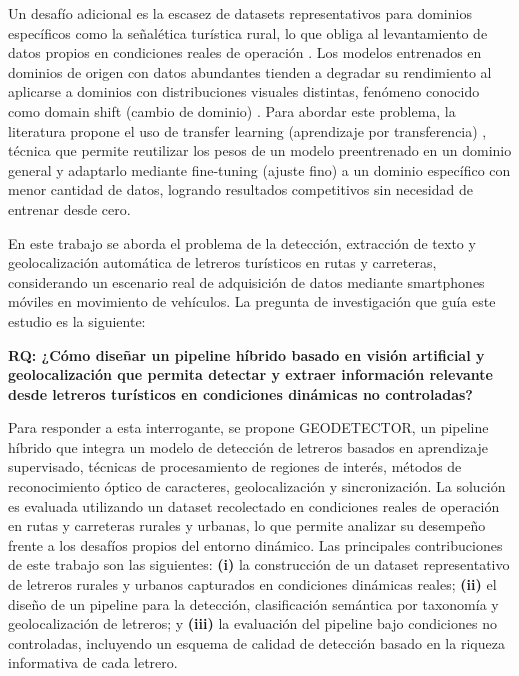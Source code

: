 \documentclass[runningheads]{llncs}
\begin{document}
Un desafío adicional es la escasez de datasets representativos
para dominios específicos como la señalética turística rural, 
lo que obliga al levantamiento de datos propios en condiciones 
reales de operación \cite{dataset-no-existentes}. Los modelos 
entrenados en dominios de origen con datos abundantes tienden a 
degradar su rendimiento al aplicarse a dominios con distribuciones 
visuales distintas, fenómeno conocido como domain 
 shift (cambio de dominio) \cite{domain-shift}. Para abordar este problema, la literatura 
propone el uso de transfer learning (aprendizaje por transferencia)
\cite{transfer-learning,transfer-learning-yolo}, técnica que permite 
reutilizar los pesos de un modelo preentrenado en un dominio general 
y adaptarlo mediante fine-tuning (ajuste fino) \cite{fine-tuning} a un dominio 
específico con menor cantidad de datos, logrando resultados competitivos 
sin necesidad de entrenar desde cero.

En este trabajo se aborda el problema de la detección, 
extracción de texto y geolocalización automática de letreros 
turísticos en rutas y carreteras, considerando un escenario real de adquisición de 
datos mediante smartphones móviles en movimiento de vehículos. La 
pregunta de investigación que guía este estudio es la siguiente:

\textbf{RQ: ¿Cómo diseñar un pipeline híbrido basado en visión artificial 
y geolocalización que permita detectar y extraer información relevante 
desde letreros turísticos en condiciones dinámicas no controladas?}

Para responder a esta interrogante, se propone GEODETECTOR, 
un pipeline híbrido que integra un modelo de detección de letreros basados
 en aprendizaje supervisado, técnicas de procesamiento de regiones 
de interés, métodos de reconocimiento óptico de caracteres, 
geolocalización y sincronización. La solución es evaluada utilizando 
un dataset recolectado en condiciones reales de operación en rutas y
carreteras rurales y urbanas, lo que permite analizar su desempeño frente a los 
desafíos propios del entorno dinámico. Las principales contribuciones 
de este trabajo son las siguientes: \textbf{(i)} la construcción de un dataset 
representativo de letreros rurales y urbanos capturados en condiciones 
dinámicas reales; \textbf{(ii)} el diseño de un pipeline para la detección, 
clasificación semántica por taxonomía y geolocalización de letreros; y 
\textbf{(iii)} la evaluación del pipeline bajo condiciones no controladas, 
incluyendo un esquema de calidad de detección basado en la riqueza 
informativa de cada letrero.
\end{document}
